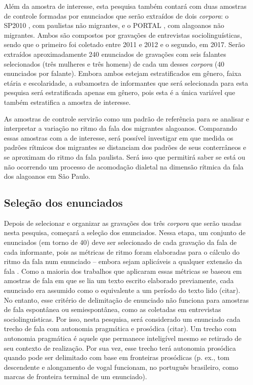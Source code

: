 \documentclass[
	a4paper,	%
	12pt,		%
	]{article}	%
\begin{document}
Além da amostra de interesse, esta pesquisa também contará com duas amostras
de controle formadas por enunciados que serão extraídos de dois
\emph{corpora}: o SP2010 \citep{Mendes.Oushiro2012}, com paulistas não
migrantes, e o PORTAL \citep{Oliveira2017}, com alagoanos não migrantes.
Ambos são compostos por gravações de entrevistas sociolinguísticas, sendo
que o primeiro foi coletado entre 2011 e 2012 e o segundo, em 2017. Serão
extraídos aproximadamente 240 enunciados de gravações com seis falantes
selecionados (três mulheres e três homens) de cada um desses \emph{corpora}
(40 enunciados por falante). Embora ambos estejam estratificados em gênero,
faixa etária e escolaridade, a subamostra de informantes que será
selecionada para esta pesquisa será estratificada apenas em gênero, pois
esta é a única variável que também estratifica a amostra de interesse.

As amostras de controle servirão como um padrão de referência para se
analisar e interpretar a variação no ritmo da fala dos migrantes alagoanos.
Comparando essas amostras com a de interesse, será possível investigar em
que medida os padrões rítmicos dos migrantes se distanciam dos padrões de
seus conterrâneos e se aproximam do ritmo da fala paulista. Será isso que
permitirá saber se está ou não ocorrendo um processo de acomodação dialetal
na dimensão rítmica da fala dos alagoanos em São Paulo.
		
\subsection{Seleção dos enunciados} \label{selecao}

Depois de selecionar e organizar as gravações dos três \emph{corpora} que
serão usadas nesta pesquisa, começará a seleção dos enunciados. Nessa etapa,
um conjunto de enunciados (em torno de 40) deve ser selecionado de cada
gravação da fala de cada informante, pois as métricas de ritmo foram
elaboradas para o cálculo do ritmo da fala num enunciado -- embora sejam
aplicáveis a qualquer extensão da fala \citep{Fuchs2016}. Como a
maioria dos trabalhos que aplicaram essas métricas se baseou em amostras de
fala em que se lia um texto escrito elaborado previamente, cada enunciado
era assumido como o equivalente a um período do texto lido (citar). No entanto, esse
critério de delimitação de enunciado não funciona para amostras de fala
espontânea ou semiespontânea, como as coletadas em entrevistas
sociolinguísticas. Por isso, nesta pesquisa, será considerado um enunciado
cada trecho de fala com autonomia pragmática e prosódica (citar). Um trecho com
autonomia pragmática é aquele que permanece inteligível mesmo se retirado de
seu contexto de realização. Por sua vez, esse trecho terá autonomia
prosódica quando pode ser delimitado com base em fronteiras prosódicas (p.
ex., tom descendente e alongamento de vogal funcionam, no português
brasileiro, como marcas de fronteira terminal de um enunciado). 
\end{document}
